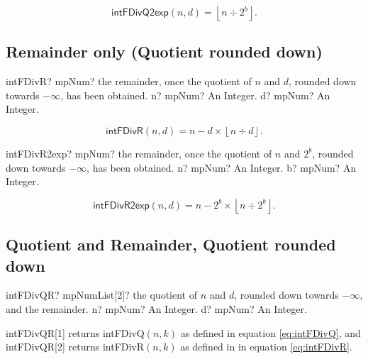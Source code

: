 \begin{equation}
	\label{eq:intFDivQ2exp}
	\textsf{intFDivQ2exp}(n, d) =\left\lfloor n \div 2^b\right\rfloor.
\end{equation}






\subsection{Remainder only (Quotient rounded down)}

\begin{mpFunctionsExtract}
	\mpFunctionTwo
	{intFDivR? mpNum? the remainder, once the quotient of $n$ and $d$, rounded down towards $-\infty$, has been obtained.}
	{n? mpNum? An Integer.}
	{d? mpNum? An Integer.}
\end{mpFunctionsExtract}

\begin{equation}
	\label{eq:intFDivR}
	\textsf{intFDivR}(n, d) =n - d \times \left\lfloor n \div d\right\rfloor.
\end{equation}

\vspace{0.3cm}
\begin{mpFunctionsExtract}
	\mpFunctionTwo
	{intFDivR2exp? mpNum? the remainder, once the quotient of $n$ and $2^b$, rounded down towards $-\infty$, has been obtained.}
	{n? mpNum? An Integer.}
	{b? mpNum? An Integer.}
\end{mpFunctionsExtract}

\begin{equation}
	\label{eq:intFDivR2exp}
	\textsf{intFDivR2exp}(n, d) =n - 2^b \times \left\lfloor n \div 2^b\right\rfloor.
\end{equation}





\subsection{Quotient and Remainder,  Quotient rounded down}

\begin{mpFunctionsExtract}
	\mpFunctionTwo
	{intFDivQR? mpNumList[2]? the quotient of $n$ and $d$, rounded down towards $-\infty$, and the remainder.}
	{n? mpNum? An Integer.}
	{d? mpNum? An Integer.}
\end{mpFunctionsExtract}

\vspace{0.3cm}
\textsf{intFDivQR}[1] returns \textsf{intFDivQ$(n, k)$} as defined in equation \ref{eq:intFDivQ}, and \textsf{intFDivQR}[2] returns \textsf{intFDivR$(n, k)$} as defined in in equation \ref{eq:intFDivR}.






